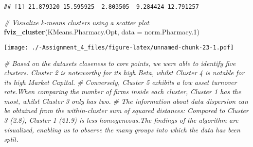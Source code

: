 \documentclass[
]{article}
\newenvironment{Shaded}{\begin{snugshade}}{\end{snugshade}}
\newcommand{\AttributeTok}[1]{\textcolor[rgb]{0.13,0.29,0.53}{#1}}
\newcommand{\CommentTok}[1]{\textcolor[rgb]{0.56,0.35,0.01}{\textit{#1}}}
\newcommand{\DecValTok}[1]{\textcolor[rgb]{0.00,0.00,0.81}{#1}}
\newcommand{\FloatTok}[1]{\textcolor[rgb]{0.00,0.00,0.81}{#1}}
\newcommand{\FunctionTok}[1]{\textcolor[rgb]{0.13,0.29,0.53}{\textbf{#1}}}
\newcommand{\NormalTok}[1]{#1}
\newcommand{\OtherTok}[1]{\textcolor[rgb]{0.56,0.35,0.01}{#1}}
\newcommand{\SpecialCharTok}[1]{\textcolor[rgb]{0.81,0.36,0.00}{\textbf{#1}}}
\begin{document}
\begin{verbatim}
## [1] 21.879320 15.595925  2.803505  9.284424 12.791257
\end{verbatim}

\begin{Shaded}
\begin{Highlighting}[]
\CommentTok{\# Visualize k{-}means clusters using a scatter plot}
\FunctionTok{fviz\_cluster}\NormalTok{(KMeans.Pharmacy.Opt, }\AttributeTok{data =}\NormalTok{ norm.Pharmacy}\FloatTok{.1}\NormalTok{)}
\end{Highlighting}
\end{Shaded}

\texttt{[image: ./-Assignment\_4\_files/figure-latex/unnamed-chunk-23-1.pdf]}

\begin{Shaded}
\begin{Highlighting}[]
\CommentTok{\# Based on the dataset\textquotesingle{}s closeness to core points, we were able to identify five clusters. Cluster 2 is noteworthy for its high Beta, whilst Cluster 4 is notable for its high Market Capital. }
\CommentTok{\# Conversely, Cluster 5 exhibits a low asset turnover rate.When comparing the number of firms inside each cluster, Cluster 1 has the most, whilst Cluster 3 only has two. }
\CommentTok{\# The information about data dispersion can be obtained from the within{-}cluster sum of squared distances: Compared to Cluster 3 (2.8), Cluster 1 (21.9) is less homogeneous.The findings of the algorithm are visualized, enabling us to observe the many groups into which the data has been split.}
\end{Highlighting}
\end{Shaded}

\begin{Shaded}
\end{Shaded}
\end{document}
